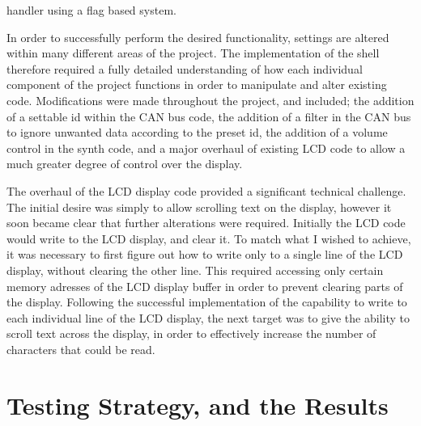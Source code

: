 handler using a flag based system.
\par\bigskip\noindent
In order to successfully perform the desired functionality, settings are altered 
within many different areas of the project. The implementation of the shell 
therefore required a fully detailed understanding of how each individual 
component of the project functions in order to manipulate and alter existing 
code. Modifications were made throughout the project, and included; the addition 
of a settable id within the CAN bus code, the addition of a filter in the CAN 
bus to ignore unwanted data according to the preset id, the addition of a 
volume control in the synth code, and a major overhaul of existing LCD code to 
allow a much greater degree of control over the display. 
\par\bigskip\noindent
The overhaul of the LCD display code provided a significant technical challenge. 
The initial desire was simply to allow scrolling text on the display, however 
it soon became clear that further alterations were required. Initially the LCD 
code would write to the LCD display, and clear it. To match what I wished to 
achieve, it was necessary to first figure out how to write only to a single 
line of the LCD display, without clearing the other line. This required 
accessing only certain memory adresses of the LCD display buffer in order to 
prevent clearing parts of the display. Following the successful implementation 
of the capability to write to each individual line of the LCD display, the next 
target was to give the ability to scroll text across the display, in order to 
effectively increase the number of characters that could be read. 


\section{Testing Strategy, and the Results}
